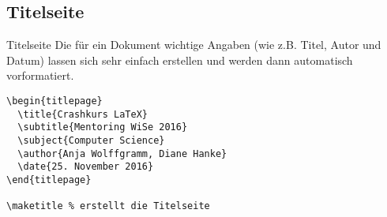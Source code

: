 \subsection{Titelseite}
\begin{frame}[fragile]{Titelseite}
Die für ein Dokument wichtige Angaben (wie z.B. Titel, Autor und Datum) lassen sich sehr einfach erstellen und werden dann automatisch vorformatiert.
\begin{lstlisting}[style=tex]
\begin{titlepage}
  \title{Crashkurs LaTeX}
  \subtitle{Mentoring WiSe 2016}
  \subject{Computer Science}
  \author{Anja Wolffgramm, Diane Hanke}
  \date{25. November 2016}
\end{titlepage}

\maketitle % erstellt die Titelseite
\end{lstlisting}


% 
% 

% 
  
% 
\end{frame}
